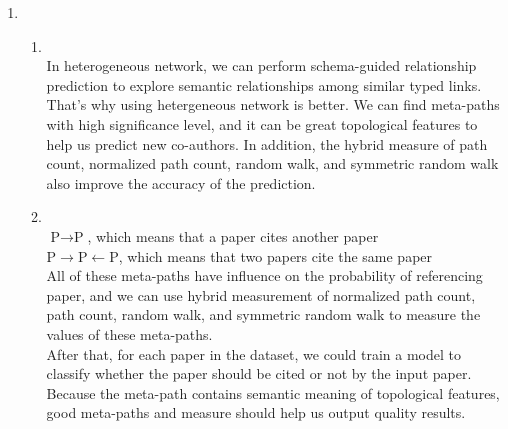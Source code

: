 \documentclass[10pt, a4paper]{article}
\begin{document}
\begin{enumerate}
\item\mbox{}
    \begin{enumerate}
    \item\mbox{}\\
        In heterogeneous network, we can perform schema-guided relationship prediction to explore semantic relationships among similar typed links. That's why using hetergeneous network is better. We can find meta-paths with high significance level, and it can be great topological features to help us predict new co-authors. In addition, the hybrid measure of path count, normalized path count, random walk, and symmetric random walk also improve the accuracy of the prediction.
    \item\mbox{}\\
        $\mbox{P}\rightarrow\mbox{P}$, which means that a paper cites another paper\\
        $\mbox{P}\rightarrow\mbox{P}\leftarrow\mbox{P}$, which means that two papers cite the same paper\\
        All of these meta-paths have influence on the probability of referencing paper, and we can use hybrid measurement of normalized path count, path count, random walk, and symmetric random walk to measure the values of these meta-paths.\\
        After that, for each paper in the dataset, we could train a model to classify whether the paper should be cited or not by the input paper. Because the meta-path contains semantic meaning of topological features, good meta-paths and measure should help us output quality results.
    \end{enumerate}

\end{enumerate}
\end{document}
